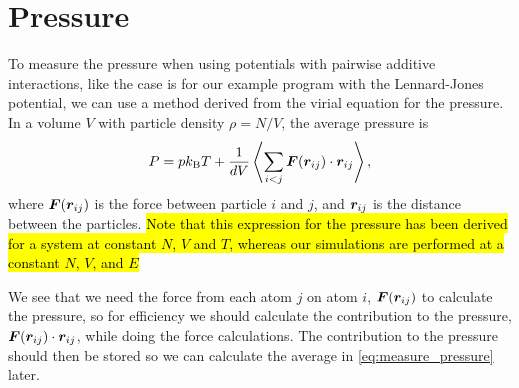 \section{Pressure\label{subsec:pressure}}
To measure the pressure when using potentials with pairwise additive interactions, like the case is for our example program with the Lennard-Jones potential, we can use a method derived from the virial equation for the pressure\cite[Section~4.4]{frenkel2001understanding}. In a volume $V$ with particle density $\rho = N/V$, the average pressure is
\begin{align}
    P = pk_\text{B}T + \frac{1}{dV} \Braket{\sum_{i<j} \boldsymbol{F} (\boldsymbol{r}_{ij}) \cdot \boldsymbol{r}_{ij}},
    \label{eq:measure_pressure}
\end{align}
where $\boldsymbol{F}(\boldsymbol{r}_{ij})$ is the force between particle $i$ and $j$, and $\boldsymbol{r}_{ij}$ is the distance between the particles. \hl{Note that this expression for the pressure has been derived for a system at constant $N$, $V$ and $T$, whereas our simulations are performed at a constant $N$, $V$, and $E$}

We see that we need the force from each atom $j$ on atom $i$, $\boldsymbol{F}(\boldsymbol{r}_{ij})$ to calculate the pressure, so for efficiency we should calculate the contribution to the pressure, $\boldsymbol{F}(\boldsymbol{r}_{ij})\cdot\boldsymbol{r}_{ij}$, while doing the force calculations. The contribution to the pressure should then be stored so we can calculate the average in \cref{eq:measure_pressure} later.

